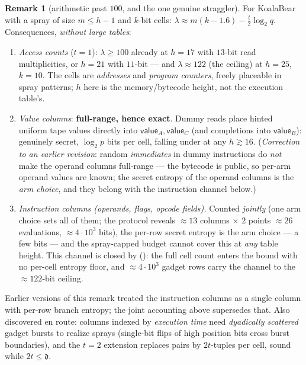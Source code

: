 \documentclass{article}
\newcommand{\extdeg}{\mathfrak{d}}
\theoremstyle{definition}
\newtheorem{remark}[theorem]{Remark}
\begin{document}
\begin{remark}[arithmetic past $100$, and the one genuine straggler]\label{rem:past100}
For KoalaBear with a spray of size $m \leq h - 1$ and $k$-bit cells: $\lambda \approx m(k - 1.6) - \tfrac{t}{2}\log_2 q$. Consequences, \emph{without large tables}:
\begin{enumerate}
    \item \emph{Access counts} ($t = 1$): $\lambda \geq 100$ already at $h = 17$ with $13$-bit read multiplicities, or $h = 21$ with $11$-bit --- and $\lambda \approx 122$ (the ceiling) at $h = 25$, $k = 10$. The cells are \emph{addresses} and \emph{program counters}, freely placeable in spray patterns; $h$ here is the memory/bytecode height, not the execution table's.
    \item \emph{Value columns}: \textbf{full-range, hence exact}. Dummy reads place hinted uniform tape values directly into $\textsf{value}_A, \textsf{value}_C$ (and completions into $\textsf{value}_B$): genuinely secret, $\log_2 p$ bits per cell, falling under  at any $h \gtrsim 16$. (\emph{Correction to an earlier revision}: random \emph{immediates} in dummy instructions do \emph{not} make the operand columns full-range --- the bytecode is public, so per-arm operand values are known; the secret entropy of the operand columns is the \emph{arm choice}, and they belong with the instruction channel below.)
    \item \emph{Instruction columns (operands, flags, opcode fields).} Counted \emph{jointly} (one arm choice sets all of them; the protocol reveals $\approx 13$ columns $\times$ $2$ points $\approx 26$ evaluations, $\approx 4 \cdot 10^3$ bits), the per-row secret entropy is the arm choice --- a few bits --- and the spray-capped budget cannot cover this at \emph{any} table height. This channel is closed by  (): the full cell count enters the bound with no per-cell entropy floor, and $\approx 4 \cdot 10^3$ gadget rows carry the channel to the $\approx 122$-bit ceiling.
\end{enumerate}
Earlier versions of this remark treated the instruction columns as a single column with per-row branch entropy; the joint accounting above supersedes that. Also discovered en route: columns indexed by \emph{execution time} need \emph{dyadically scattered} gadget bursts to realize sprays (single-bit flips of high position bits cross burst boundaries), and the $t = 2$ extension replaces pairs by $2t$-tuples per cell, sound while $2t \leq \extdeg$.
\end{remark}
\end{document}
